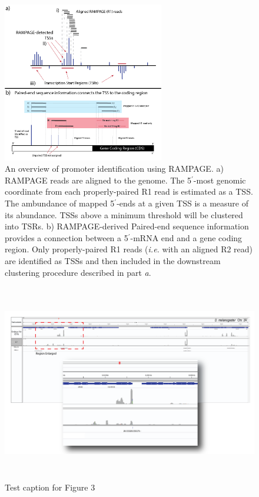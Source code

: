 \documentclass[runningheads,a4paper]{llncs}
\begin{document}
\begin{linenumbers}
\begin{figure}
\centering
\includegraphics[height=7cm]{Figures/Insect_Chapter_Figure_2.png}
\caption{An overview of promoter identification using RAMPAGE. a) RAMPAGE reads are aligned to the genome. The 5$^\prime$-most genomic coordinate from each properly-paired R1 read is estimated as a TSS. The ambundance of mapped 5$^\prime$-ends at a given TSS is a measure of its abundance. TSSs above a minimum threshold will be clustered into TSRs. b) RAMPAGE-derived Paired-end sequence information provides a connection between a 5$^\prime$-mRNA end and a gene coding region. Only properly-paired R1 reads (\textit{i.e.} with an aligned R2 read) are identified as TSSs and then included in the downstream clustering procedure described in part \textit{a}.}
\label{fig:figure2}
\end{figure}

\begin{figure}
\centering
\includegraphics[height=8.65cm]{Figures/Insect_Chapter_Figure_3.png}
\caption{Test caption for Figure 3}
\label{fig:figure3}
\end{figure}


\end{linenumbers}
\end{document}
